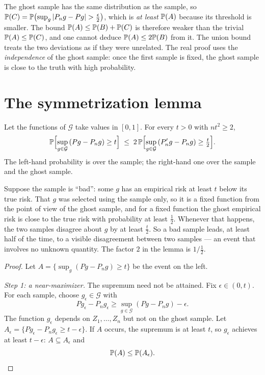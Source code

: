\begin{notechapter}
\begin{pitfall}
The ghost sample has the same distribution as the sample, so
$\mathbb{P}(C) = \mathbb{P}\bigl(\sup_g\left|P_n g - Pg\right| > \frac\epsilon2\bigr)$, which is
\emph{at least} $\mathbb{P}(A)$ because its threshold is smaller. The bound
$\mathbb{P}(A) \leq \mathbb{P}(B) + \mathbb{P}(C)$ is therefore weaker than the trivial
$\mathbb{P}(A)\leq\mathbb{P}(C)$, and one cannot deduce $\mathbb{P}(A) \leq 2\mathbb{P}(B)$ from it.
The union bound treats the two deviations as if they were unrelated. The real
proof uses the \emph{independence} of the ghost sample: once the first sample
is fixed, the ghost sample is close to the truth with high probability.
\end{pitfall}

\section{The symmetrization lemma}\label{symmetrization-lemma:sec:lemma}

\begin{lemma}[Symmetrization]\label{symmetrization-lemma:lem:main}
Let the functions of $\mathcal G$ take values in $[0,1]$. For every $t > 0$
with $nt^2 \geq 2$,
\[
  \mathbb{P}\Bigl[\sup_{g\in\mathcal G}\,(Pg - P_n g) \geq t\Bigr]
  \;\leq\; 2\,\mathbb{P}\Bigl[\sup_{g\in\mathcal G}\,(P'_n g - P_n g) \geq \tfrac t2\Bigr].
\]
The left-hand probability is over the sample; the right-hand one over the
sample and the ghost sample.
\end{lemma}

\begin{intuition}
Suppose the sample is ``bad'': some $g$ has an empirical risk at least $t$ below
its true risk. That $g$ was selected using the sample only, so it is a fixed
function from the point of view of the ghost sample, and for a fixed function
the ghost empirical risk is close to the true risk with probability at least
$\frac12$. Whenever that happens, the two samples disagree about $g$ by at
least $\frac t2$. So a bad sample leads, at least half of the time, to a visible
disagreement between two samples --- an event that involves no unknown
quantity. The factor $2$ in the lemma is $1/\frac12$.
\end{intuition}

\begin{proof}
Let $A = \{\sup_g (Pg - P_n g) \geq t\}$ be the event on the left.

\emph{Step 1: a near-maximizer.} The supremum need not be attained. Fix
$\epsilon\in(0,t)$. For each sample, choose $g_\epsilon \in \mathcal G$ with
\[
  Pg_\epsilon - P_n g_\epsilon \geq \sup_{g\in\mathcal G}(Pg - P_ng) - \epsilon .
\]
The function $g_\epsilon$ depends on $Z_1,\dots,Z_n$ but not on the ghost
sample. Let $A_\epsilon = \{Pg_\epsilon - P_n g_\epsilon \geq t-\epsilon\}$. If
$A$ occurs, the supremum is at least $t$, so $g_\epsilon$ achieves at least
$t - \epsilon$: $A\subseteq A_\epsilon$ and
\begin{equation}\label{symmetrization-lemma:eq:step1}
  \mathbb{P}(A) \leq \mathbb{P}(A_\epsilon).
\end{equation}


\end{proof}
\end{notechapter}
